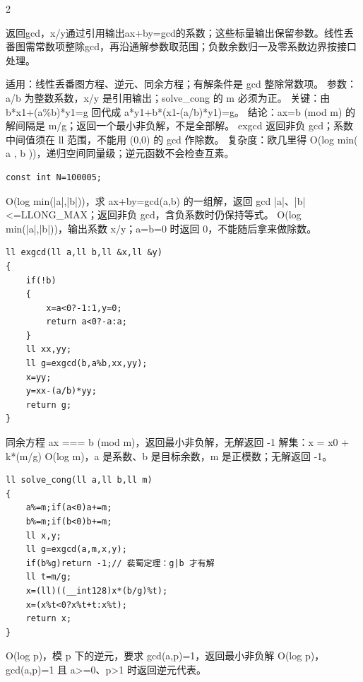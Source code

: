 \documentclass[UTF8,fontset=fandol,a4paper,twoside]{ctexart}
\newcommand{\note}[1]{{\fontsize{10}{12}\selectfont #1\par}}
\begin{document}
\begin{multicols}{2}
\note{返回gcd，x/\allowbreak{}y通过引用输出ax+\allowbreak{}by=\allowbreak{}gcd的系数；这些标量输出保留参数。线性丢番图需常数项整除gcd，再沿通解参数取范围；负数余数归一及零系数边界按接口处理。}
\note{适用：线性丢番图方程、逆元、同余方程；有解条件是 gcd 整除常数项。 参数：a/\allowbreak{}b 为整数系数，x/\allowbreak{}y 是引用输出；solve\_cong 的 m 必须为正。 关键：由 b*x1+\allowbreak{}(\allowbreak{}a\%b)\allowbreak{}*y1=\allowbreak{}g 回代成 a*y1+\allowbreak{}b*(\allowbreak{}x1-\allowbreak{}(\allowbreak{}a/\allowbreak{}b)\allowbreak{}*y1)\allowbreak{}=\allowbreak{}g。 结论：ax=\allowbreak{}b (\allowbreak{}mod m)\allowbreak{} 的解间隔是 m/\allowbreak{}g；返回一个最小非负解，不是全部解。 exgcd 返回非负 gcd；系数中间值须在 ll 范围，不能用 (\allowbreak{}0,\allowbreak{}0)\allowbreak{} 的 gcd 作除数。 复杂度：欧几里得 O(\allowbreak{}log min(\allowbreak{} a ,\allowbreak{} b )\allowbreak{})\allowbreak{}，递归空间同量级；逆元函数不会检查互素。}
\begin{lstlisting}
const int N=100005;
\end{lstlisting}
\note{O(\allowbreak{}log min(\allowbreak{}|a|,\allowbreak{}|b|)\allowbreak{})\allowbreak{}，求 ax+\allowbreak{}by=\allowbreak{}gcd(\allowbreak{}a,\allowbreak{}b)\allowbreak{} 的一组解，返回 gcd |a|、|b|<\allowbreak{}=\allowbreak{}LLONG\_MAX；返回非负 gcd，含负系数时仍保持等式。 O(\allowbreak{}log min(\allowbreak{}|a|,\allowbreak{}|b|)\allowbreak{})\allowbreak{}，输出系数 x/\allowbreak{}y；a=\allowbreak{}b=\allowbreak{}0 时返回 0，不能随后拿来做除数。}
\begin{lstlisting}
ll exgcd(ll a,ll b,ll &x,ll &y)
{
    if(!b)
    {
        x=a<0?-1:1,y=0;
        return a<0?-a:a;
    }
    ll xx,yy;
    ll g=exgcd(b,a%b,xx,yy);
    x=yy;
    y=xx-(a/b)*yy;
    return g;
}
\end{lstlisting}
\note{同余方程 ax =\allowbreak{}=\allowbreak{}=\allowbreak{} b (\allowbreak{}mod m)\allowbreak{}，返回最小非负解，无解返回 -\allowbreak{}1 解集：x =\allowbreak{} x0 +\allowbreak{} k*(\allowbreak{}m/\allowbreak{}g)\allowbreak{} O(\allowbreak{}log m)\allowbreak{}，a 是系数、b 是目标余数，m 是正模数；无解返回 -\allowbreak{}1。}
\begin{lstlisting}
ll solve_cong(ll a,ll b,ll m)
{
    a%=m;if(a<0)a+=m;
    b%=m;if(b<0)b+=m;
    ll x,y;
    ll g=exgcd(a,m,x,y);
    if(b%g)return -1;// 裴蜀定理：g|b 才有解
    ll t=m/g;
    x=(ll)((__int128)x*(b/g)%t);
    x=(x%t<0?x%t+t:x%t);
    return x;
}
\end{lstlisting}
\note{O(\allowbreak{}log p)\allowbreak{}，模 p 下的逆元，要求 gcd(\allowbreak{}a,\allowbreak{}p)\allowbreak{}=\allowbreak{}1，返回最小非负解 O(\allowbreak{}log p)\allowbreak{}，gcd(\allowbreak{}a,\allowbreak{}p)\allowbreak{}=\allowbreak{}1 且 a>\allowbreak{}=\allowbreak{}0、p>\allowbreak{}1 时返回逆元代表。}

\end{multicols}
\end{document}

